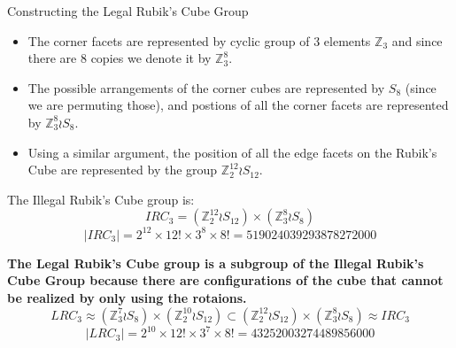\documentclass[final]{beamer}
\newlength{\colwidth}
\begin{document}
\begin{frame}[t]
\begin{columns}[t]
\begin{column}{\colwidth}
\begin{block}{Constructing the Legal Rubik's Cube Group}

\begin{itemize}
\item The corner facets are represented by cyclic group of 3 elements $\mathbb{Z}_{3}$ and since there are $8$ copies we denote it by $\mathbb{Z}_3 ^8$.
\item The possible arrangements of the corner cubes are represented by $S_{8}$ (since we are permuting those), and postions of all the corner facets are represented by $\mathbb{Z}_{3}^{8} \wr S_{8}$.
\item Using a similar argument, the position of all the edge facets on the Rubik's Cube are represented by the group $\mathbb{Z}^{12}_{2} \wr S_{12}$.
\end{itemize}

    The Illegal Rubik's Cube group is:
    $$IRC_{3} = (\mathbb{Z}^{12}_2 \wr S_{12}) \times (\mathbb{Z}^8_3 \wr S_8)$$
$$|IRC_{3}| = 2^{12} \times 12! \times 3^8 \times 8! = 519024039293878272000$$

\textbf{The Legal Rubik's Cube group is a subgroup of the Illegal Rubik's Cube Group because there are configurations of the cube that cannot be realized by only using the rotaions.}
$$LRC_{3} \approx (\mathbb{Z}_{3}^{7} \wr S_{8}) \times (\mathbb{Z}_{2}^{10} \wr S_{12}) \subset  (\mathbb{Z}^{12}_2 \wr S_{12}) \times (\mathbb{Z}^8_3 \wr S_8) \approx IRC_{3}$$
$$ |LRC_{3}| = 2^{10} \times 12! \times 3^7 \times 8! = 43252003274489856000$$













\end{block}
\end{column}
\end{columns}
\end{frame}
\end{document}
